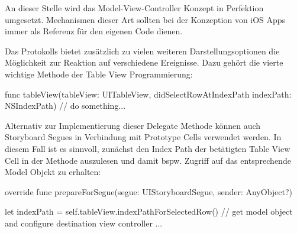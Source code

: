 \documentclass[parskip=half, final]{scrreprt}
\begin{document}
An dieser Stelle wird das Model-View-Controller Konzept  in Perfektion umgesetzt. Mechanismen dieser Art sollten bei der Konzeption von iOS Apps immer als Referenz für den eigenen Code dienen.

Das  Protokolls bietet zusätzlich zu vielen weiteren Darstellungsoptionen die Möglichkeit zur Reaktion auf verschiedene Ereignisse. Dazu gehört die vierte wichtige Methode der Table View Programmierung:

\begin{swiftcode}
func tableView(tableView: UITableView, didSelectRowAtIndexPath indexPath: NSIndexPath) {
    // do something...
}
\end{swiftcode}

Alternativ zur Implementierung dieser Delegate Methode können auch Storyboard Segues in Verbindung mit Prototype Cells verwendet werden. In diesem Fall ist es sinnvoll, zunächst den Index Path der betätigten Table View Cell in der  Methode auszulesen und damit bspw. Zugriff auf das entsprechende Model Objekt zu erhalten:

\begin{swiftcode}
override func prepareForSegue(segue: UIStoryboardSegue, sender: AnyObject?) {
    let indexPath = self.tableView.indexPathForSelectedRow()
    // get model object and configure destination view controller ...

}
\end{swiftcode}



\end{document}
